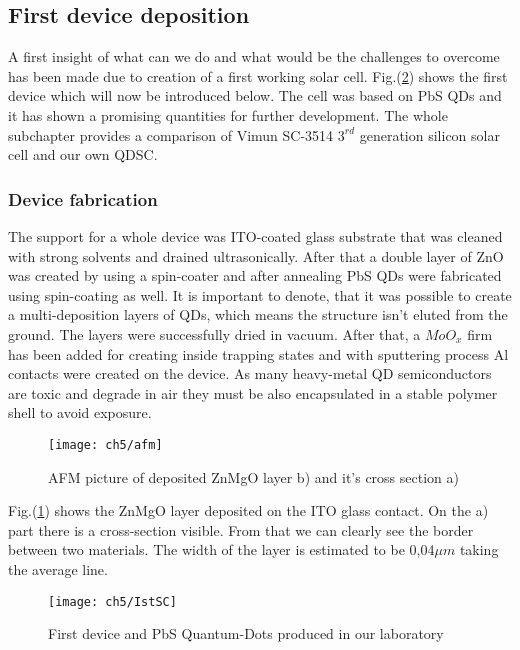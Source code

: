 \subsection{First device deposition}

A first insight of what can we do and what would be the challenges to overcome has been made due to creation of a first working solar cell. Fig.(\ref{fig:1stdev}) shows the first device which will now be introduced below. The cell was based on PbS QDs and it has shown a promising quantities for further development. The whole subchapter provides a comparison of Vimun SC-3514 $3^{rd}$ generation silicon solar cell and our own QDSC.

\newpage
\subsubsection{Device fabrication}
The support for a whole device was ITO-coated glass substrate that was cleaned with strong solvents and drained ultrasonically. After that a double layer of ZnO was created by using a spin-coater and after annealing PbS QDs were fabricated using spin-coating as well. It is important to denote, that it was possible to create a multi-deposition layers of QDs, which means the structure isn’t eluted from the ground. The layers were successfully dried in vacuum. After that, a $MoO_x$ firm has been added for creating inside trapping states and with sputtering process Al contacts were created on the device. As many heavy-metal QD semiconductors are toxic and degrade in air they must be also encapsulated in a stable polymer shell to avoid exposure. 

\begin{figure}[H]
\center
\texttt{[image: ch5/afm]}
\caption{AFM picture of deposited ZnMgO layer b) and it's cross section a)}
\label{fig:afm}
\end{figure}

Fig.(\ref{fig:afm}) shows the ZnMgO layer deposited on the ITO glass contact. On the a) part there is a cross-section visible. From that we can clearly see the border between two materials. The width of the layer is estimated to be 0,04$\mu m$ taking the average line. 

\begin{figure}
\center
\texttt{[image: ch5/IstSC]}
\caption{First device and PbS Quantum-Dots produced in our laboratory}
\label{fig:1stdev}
\end{figure}

